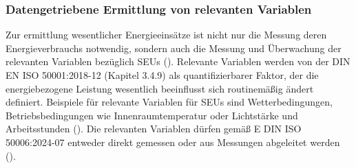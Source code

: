 \subsubsection{Datengetriebene Ermittlung von relevanten Variablen}

Zur ermittlung wesentlicher Energieeinsätze ist nicht nur die Messung deren Energieverbrauchs notwendig, sondern auch die Messung und Überwachung der relevanten Variablen 
bezüglich SEUs (\cite[S. 23]{DIN50001.2018}). 
Relevante Variablen werden von der DIN EN ISO 50001:2018-12 (Kapitel 3.4.9) als quantifizierbarer Faktor, der die energiebezogene Leistung wesentlich beeinflusst sich 
routinemäßig ändert definiert. 
Beispiele für relevante Variablen für SEUs sind Wetterbedingungen, Betriebsbedingungen wie Innenraumtemperatur oder Lichtstärke und Arbeitsstunden (\cite[Kapitel 3.4.9]{DIN50001.2018}).
Die relevanten Variablen dürfen gemäß E DIN ISO 50006:2024-07 entweder direkt gemessen oder aus Messungen abgeleitet werden (\cite[S. 18]{DIN50006.2024}).